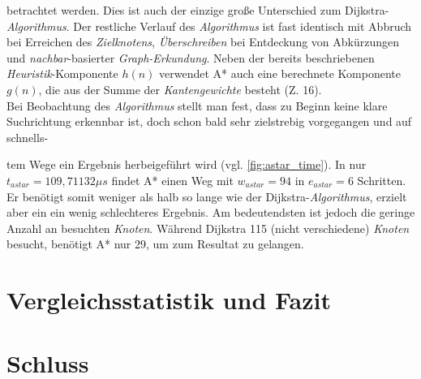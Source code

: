 \documentclass[12pt]{article}
\begin{document}
betrachtet werden. Dies ist auch der einzige große Unterschied zum Dijkstra-\textit{Algorithmus}. Der restliche Verlauf des \textit{Algorithmus} ist fast identisch mit Abbruch bei Erreichen des \textit{Zielknotens}, \textit{Überschreiben} bei Entdeckung von Abkürzungen und \textit{nachbar}-basierter \textit{Graph-Erkundung}. Neben der bereits beschriebenen \textit{Heuristik}-Komponente $h(n)$ verwendet A* auch eine berechnete Komponente $g(n)$, die aus der Summe der \textit{Kantengewichte} besteht (Z. 16).
\\
Bei Beobachtung des \textit{Algorithmus} stellt man fest, dass zu Beginn keine klare Suchrichtung erkennbar ist, doch schon bald sehr zielstrebig vorgegangen und auf schnells-

\noindent tem Wege ein Ergebnis herbeigeführt wird (vgl. \autoref{fig:astar_time}). In nur $t_{astar} = 109,71132\mu s$ findet A* einen Weg mit $w_{astar} = 94$ in $e_{astar} = 6$ Schritten. Er benötigt somit weniger als halb so lange wie der Dijkstra-\textit{Algorithmus}, erzielt aber ein ein wenig schlechteres Ergebnis. Am bedeutendsten ist jedoch die geringe Anzahl an besuchten \textit{Knoten}. Während Dijkstra 115 (nicht verschiedene) \textit{Knoten} besucht, benötigt A* nur 29, um zum Resultat zu gelangen.

\clearpage

\section{Vergleichsstatistik und Fazit}
\newpage
\section{Schluss}
\newpage
\end{document}
